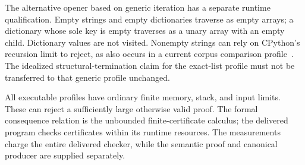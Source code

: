 The alternative opener based on generic iteration has a separate
runtime qualification.  Empty strings and empty dictionaries traverse
as empty arrays; a dictionary whose sole key is empty traverses as a
unary array with an empty child.  Dictionary values are not visited.
Nonempty strings can rely on CPython's recursion limit to reject, as
also occurs in a current corpus comparison profile~\cite{transient}.
The idealized structural-termination claim for the exact-list profile
must not be transferred to that generic profile unchanged.

All executable profiles have ordinary finite memory, stack, and input
limits.  These can reject a sufficiently large otherwise valid proof.
The formal consequence relation is the unbounded finite-certificate
calculus; the delivered program checks certificates within its runtime
resources.  The measurements charge the entire delivered checker,
while the semantic proof and canonical producer are supplied separately.

